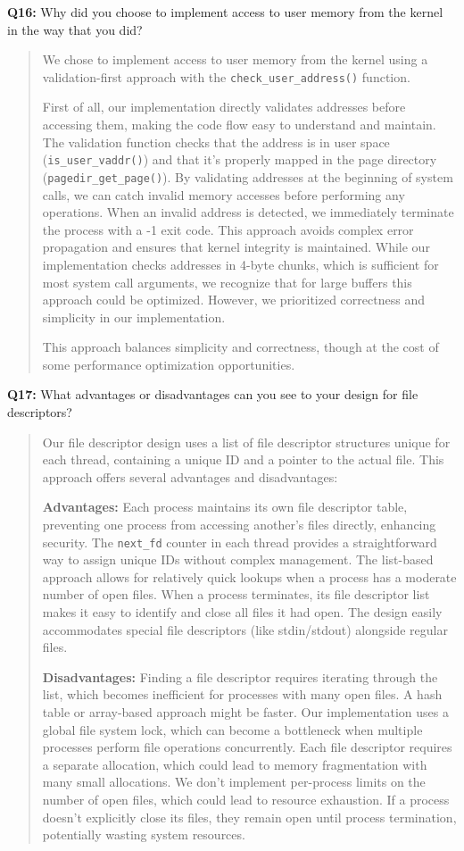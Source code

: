 \documentclass[a4paper,11pt]{paper}
\begin{document}
\textbf{Q16:} Why did you choose to implement access to user memory from the kernel in the way that you did?
\begin{quote}
We chose to implement access to user memory from the kernel using a validation-first approach with the \texttt{check\_user\_address()} function.

First of all, our implementation directly validates addresses before accessing them, making the code flow easy to understand and maintain. The validation function checks that the address is in user space (\texttt{is\_user\_vaddr()}) and that it's properly mapped in the page directory (\texttt{pagedir\_get\_page()}). By validating addresses at the beginning of system calls, we can catch invalid memory accesses before performing any operations. When an invalid address is detected, we immediately terminate the process with a -1 exit code. This approach avoids complex error propagation and ensures that kernel integrity is maintained. While our implementation checks addresses in 4-byte chunks, which is sufficient for most system call arguments, we recognize that for large buffers this approach could be optimized. However, we prioritized correctness and simplicity in our implementation.

This approach balances simplicity and correctness, though at the cost of some performance optimization opportunities.
\end{quote}

\newpage
\textbf{Q17:} What advantages or disadvantages can you see to your design for file descriptors?
\begin{quote}
Our file descriptor design uses a list of file descriptor structures unique for each thread, containing a unique ID and a pointer to the actual file. This approach offers several advantages and disadvantages:

\textbf{Advantages:}
Each process maintains its own file descriptor table, preventing one process from accessing another's files directly, enhancing security.
The \texttt{next\_fd} counter in each thread provides a straightforward way to assign unique IDs without complex management.
The list-based approach allows for relatively quick lookups when a process has a moderate number of open files.
When a process terminates, its file descriptor list makes it easy to identify and close all files it had open.
The design easily accommodates special file descriptors (like stdin/stdout) alongside regular files.

\textbf{Disadvantages:}
Finding a file descriptor requires iterating through the list, which becomes inefficient for processes with many open files. A hash table or array-based approach might be faster.
Our implementation uses a global file system lock, which can become a bottleneck when multiple processes perform file operations concurrently.
Each file descriptor requires a separate allocation, which could lead to memory fragmentation with many small allocations.
We don't implement per-process limits on the number of open files, which could lead to resource exhaustion.
If a process doesn't explicitly close its files, they remain open until process termination, potentially wasting system resources.
\end{quote}
\end{document}
